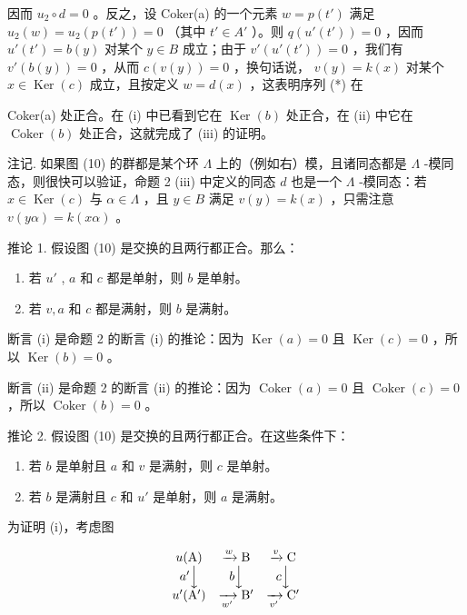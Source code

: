 因而 \(u_2 \circ d = 0\) 。反之，设 Coker(a) 的一个元素 \(w = p(t')\) 满足 \(u_2(w) = u_2(p(t')) = 0\) （其中 \(t' \in A'\) ）。则 \(q(u'(t')) = 0\) ，因而 \(u'(t') = b(y)\) 对某个 \(y \in B\) 成立；由于 \(v'(u'(t')) = 0\) ，我们有 \(v'(b(y)) = 0\) ，从而 \(c(v(y)) = 0\) ，换句话说， \(v(y) = k(x)\) 对某个 \(x \in \operatorname{Ker}(c)\) 成立，且按定义 \(w = d(x)\) ，这表明序列 (*) 在

Coker(a) 处正合。在 (i) 中已看到它在 \(\operatorname{Ker}(b)\) 处正合，在 (ii) 中它在 \(\operatorname{Coker}(b)\) 处正合，这就完成了 (iii) 的证明。

注记. 如果图 (10) 的群都是某个环 \(\Lambda\) 上的（例如右）模，且诸同态都是 \(\Lambda\) -模同态，则很快可以验证，命题 2 (iii) 中定义的同态 \(d\) 也是一个 \(\Lambda\) -模同态：若 \(x \in \operatorname{Ker}(c)\) 与 \(\alpha \in \Lambda\) ，且 \(y \in B\) 满足 \(v(y) = k(x)\) ，只需注意 \(v(y\alpha) = k(x\alpha)\) 。

推论 1. 假设图 (10) 是交换的且两行都正合。那么：

\begin{enumerate}
\def\labelenumi{(\roman{enumi})}
\item
  若 \(u'\) , \(a\) 和 \(c\) 都是单射，则 \(b\) 是单射。
\item
  若 \(v, a\) 和 \(c\) 都是满射，则 \(b\) 是满射。
\end{enumerate}

断言 (i) 是命题 2 的断言 (i) 的推论：因为 \(\operatorname{Ker}(a) = 0\) 且 \(\operatorname{Ker}(c) = 0\) ，所以 \(\operatorname{Ker}(b) = 0\) 。

断言 (ii) 是命题 2 的断言 (ii) 的推论：因为 \(\operatorname{Coker}(a) = 0\) 且 \(\operatorname{Coker}(c) = 0\) ，所以 \(\operatorname{Coker}(b) = 0\) 。

推论 2. 假设图 (10) 是交换的且两行都正合。在这些条件下：

\begin{enumerate}
\def\labelenumi{(\roman{enumi})}
\item
  若 \(b\) 是单射且 \(a\) 和 \(v\) 是满射，则 \(c\) 是单射。
\item
  若 \(b\) 是满射且 \(c\) 和 \(u'\) 是单射，则 \(a\) 是满射。
\end{enumerate}

为证明 (i)，考虑图

\[
\begin{array}{c c c} u (\mathrm{A}) & \xrightarrow {w} \mathrm{B} & \xrightarrow {v} \mathrm{C} \\ a ^ {\prime} \Big \downarrow & b \Big \downarrow & c \Big \downarrow \\ u ^ {\prime} (\mathrm{A} ^ {\prime}) & \xrightarrow [ w ^ {\prime} ]{} \mathrm{B} ^ {\prime} & \xrightarrow [ v ^ {\prime} ]{} \mathrm{C} ^ {\prime} \end{array}
\]

